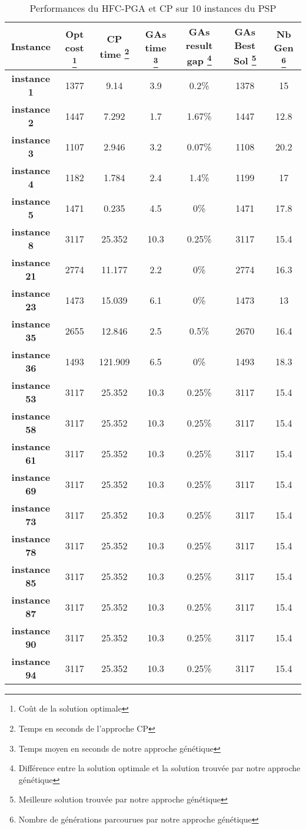 	\begin{table}[h]
		\centering
		\begin{tabular}{|c|c|c|c|c|c|c|}
			\hline
			\textbf{Instance} & \textbf{Opt cost \footnote{Coût de la solution optimale}} & \textbf{CP time \footnote{Temps en seconds de l'approche CP}} & \textbf{GAs time \footnote{Temps moyen en seconds de notre approche génétique}} & \textbf{GAs result gap \footnote{Différence entre la solution optimale et la solution trouvée par notre approche génétique}} & \textbf{GAs Best Sol \footnote{Meilleure solution trouvée par notre approche génétique}} & \textbf{Nb Gen \footnote{Nombre de générations parcourues par notre approche génétique}}\\
			\hline
			\textbf{instance 1} & 1377 & 9.14 & 3.9 & 0.2\% & 1378 & 15 \\
			\textbf{instance 2} & 1447 & 7.292 & 1.7 & 1.67\% & 1447 & 12.8\\
			\textbf{instance 3} & 1107 & 2.946 & 3.2 & 0.07\% & 1108 & 20.2\\
			\textbf{instance 4} & 1182 & 1.784 & 2.4 & 1.4\% & 1199 & 17\\
			\textbf{instance 5} & 1471 & 0.235 & 4.5 & 0\% & 1471 & 17.8\\
			\textbf{instance 8} & 3117 & 25.352 & 10.3 & 0.25\% & 3117 & 15.4\\
			\textbf{instance 21} & 2774 & 11.177 & 2.2 & 0\% & 2774 & 16.3\\
			\textbf{instance 23} & 1473 & 15.039 & 6.1 & 0\% & 1473 & 13\\
			\textbf{instance 35} & 2655 & 12.846 & 2.5 & 0.5\% & 2670 & 16.4\\
			\textbf{instance 36} & 1493 & 121.909 & 6.5 & 0\% & 1493 & 18.3\\
			\textbf{instance 53} & 3117 & 25.352 & 10.3 & 0.25\% & 3117 & 15.4\\
			\textbf{instance 58} & 3117 & 25.352 & 10.3 & 0.25\% & 3117 & 15.4\\
			\textbf{instance 61} & 3117 & 25.352 & 10.3 & 0.25\% & 3117 & 15.4\\
			\textbf{instance 69} & 3117 & 25.352 & 10.3 & 0.25\% & 3117 & 15.4\\
			\textbf{instance 73} & 3117 & 25.352 & 10.3 & 0.25\% & 3117 & 15.4\\
			\textbf{instance 78} & 3117 & 25.352 & 10.3 & 0.25\% & 3117 & 15.4\\
			\textbf{instance 85} & 3117 & 25.352 & 10.3 & 0.25\% & 3117 & 15.4\\
			\textbf{instance 87} & 3117 & 25.352 & 10.3 & 0.25\% & 3117 & 15.4\\
			\textbf{instance 90} & 3117 & 25.352 & 10.3 & 0.25\% & 3117 & 15.4\\
			\textbf{instance 94} & 3117 & 25.352 & 10.3 & 0.25\% & 3117 & 15.4\\
			
			\hline
		\end{tabular}	
		\caption{Performances du HFC-PGA et CP sur 10 instances du PSP}	
		\label{tab:hfc_pga_cp}
	\end{table}			
	
